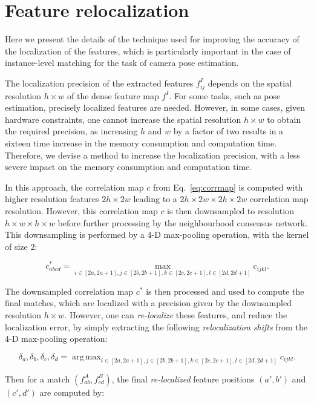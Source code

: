 \documentclass{article}
\DeclareMathOperator*{\argmax}{arg\,max}
\begin{document}
\section{Feature relocalization \label{apx:feature_reloc}}
Here we present the details of the technique used for improving the accuracy of the localization of the features, which is particularly important in the case of instance-level matching for the task of camera pose estimation.

The localization precision of the extracted features $f^I_{ij}$ depends on the spatial resolution $h\times w$ of the dense feature map $f^I$. For some tasks, such as pose estimation, precisely localized features are needed. However, in some cases, given hardware constraints, one cannot increase the spatial resolution $h\times w$ to obtain the required precision, as increasing $h$ and $w$ by a factor of two results in a sixteen time increase in the memory consumption and computation time. Therefore, we devise a method to increase the localization precision, with a less severe impact on the memory consumption and computation time.

In this approach, the correlation map $c$ from Eq.~\eqref{eq:corrmap} is computed with higher resolution features $2h
\times 2w$ leading to a $2h \times 2w\times 2h\times 2w$ correlation map resolution. However, this correlation map $c$ is then downsampled to resolution $h\times w\times h\times w$ before further processing by the neighbourhood consensus network. This downsampling is performed by a 4-D max-pooling operation, with the kernel of size 2:

\begin{equation}
    c^{*}_{abcd}=\max_{i\in[2a,2a+1],j\in[2b,2b+1],k\in[2c,2c+1],l\in[2d,2d+1]} c_{ijkl}.
\end{equation}

The downsampled correlation map $c^{*}$ is then processed and used to compute the final matches, which are localized with a precision given by the downsampled resolution $h\times w$.
However, one can \emph{re-localize} these features, and reduce the localization error, by simply extracting the following \emph{relocalization shifts} from the 4-D max-pooling operation:

\begin{equation}
    \delta_a,\delta_b,\delta_c,\delta_d =\argmax_{i\in[2a,2a+1],j\in[2b,2b+1],k\in[2c,2c+1],l\in[2d,2d+1]} c_{ijkl}.
\end{equation}

Then for a match $(f^A_{ab},f^B_{cd})$, the final \emph{re-localized} feature positions $(a',b')$ and $(c',d')$ are computed by:
\end{document}
